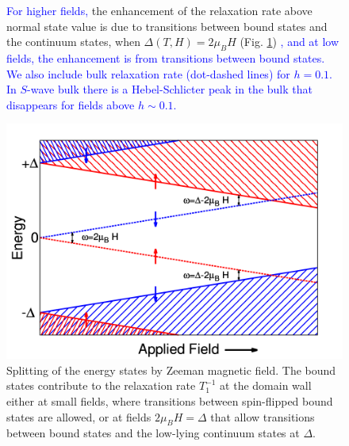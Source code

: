 \documentclass[prb,aps,showpacs,amsmath,twocolumn,10pt]{revtex4-1}
\newcommand{\blue}{\textcolor{blue}}
\newcommand{\red}{\textcolor{red}}
\begin{document}
\begin{figure}
{%
\blue{For higher fields,} the enhancement of the relaxation rate above normal state value is due to transitions between 
bound states and the continuum states, when $\Delta(T,H) = 2 \mu_B H$ (Fig. \ref{fig:rel_trans}) \blue{, and at low fields, the enhancement is from transitions between bound states. We also include bulk relaxation rate (dot-dashed lines) for $h=0.1$. In $S$-wave bulk there is a Hebel-Schlicter peak in the bulk that disappears for fields above $h\sim 0.1$.}
}
\end{figure}

\begin{figure}
\includegraphics[scale=0.25]{./Fig5} 
\caption{\label{fig:rel_trans}
Splitting of the energy states by Zeeman magnetic field. The bound states contribute to the relaxation rate 
$T_1^{-1}$ at the domain wall either at small fields, where transitions between spin-flipped bound states are allowed, 
or at fields $2\mu_B H = \Delta$ that allow transitions between bound states and the low-lying continuum 
states at $\Delta$. 
}
\end{figure}
\end{document}
